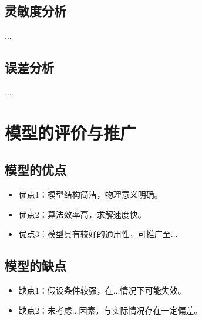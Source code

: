 \documentclass[withoutpreface,notoc]{cumcmthesis}
\begin{document}
	\subsection{灵敏度分析}
	...
	\subsection{误差分析}
	...
	\section{模型的评价与推广}
	\subsection{模型的优点}
	\begin{itemize}[itemindent=2em]
		\item 优点1：模型结构简洁，物理意义明确。
		\item 优点2：算法效率高，求解速度快。
		\item 优点3：模型具有较好的通用性，可推广至...
	\end{itemize}
	\subsection{模型的缺点}
	\begin{itemize}[itemindent=2em]
		\item 缺点1：假设条件较强，在...情况下可能失效。
		\item 缺点2：未考虑...因素，与实际情况存在一定偏差。
	\end{itemize}
	
	
\end{document}

